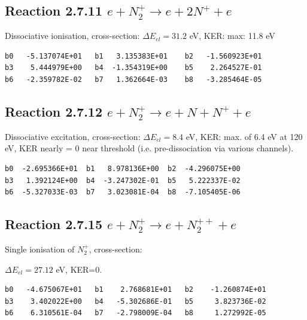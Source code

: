 \documentclass[12pt,dvips]{article}
\begin{document}
\subsection{
Reaction 2.7.11  $e + N_2^+ \rightarrow e + 2 N^+ +e$ }
Dissociative ionisation, cross-section: \cite{kn:Bahati}
$\Delta E_{el} = 31.2 $ eV, KER: max: 11.8 eV

\begin{small}\begin{verbatim}
b0   -5.137074E+01   b1   3.135383E+01    b2   -1.560923E+01
b3    5.444979E+00   b4  -1.354319E+00    b5    2.264527E-01
b6   -2.359782E-02   b7   1.362664E-03    b8   -3.285464E-05
\end{verbatim}\end{small}



\subsection{
Reaction 2.7.12  $e + N_2^+ \rightarrow e + N + N^+ +e$ }
Dissociative excitation, cross-section:
\cite{kn:Bahati}
$\Delta E_{el} = 8.4 $ eV, KER: max. of 6.4 eV at 120 eV, KER nearly = 0 near threshold (i.e.
pre-dissociation via various channels).

\begin{small}\begin{verbatim}
b0  -2.695366E+01  b1   8.978136E+00  b2  -4.296075E+00
b3   1.392124E+00  b4  -3.247302E-01  b5   5.222337E-02
b6  -5.327033E-03  b7   3.023081E-04  b8  -7.105405E-06
\end{verbatim}\end{small}

\subsection{
Reaction 2.7.15  $e + N_2^+ \rightarrow e + N_2^{++} +e$ }
Single ionisation of $N_2^+$, cross-section: \cite{kn:Bahati}

$\Delta E_{el} = 27.12 $ eV,  KER=0.

\begin{small}\begin{verbatim}
b0   -4.675067E+01   b1    2.768681E+01   b2    -1.260874E+01
b3    3.402022E+00   b4   -5.302686E-01   b5     3.823736E-02
b6    6.310561E-04   b7   -2.798009E-04   b8     1.272992E-05
\end{verbatim}\end{small}
\end{document}

